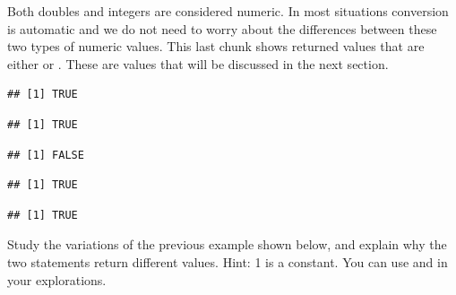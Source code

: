 \documentclass[krantz2]{krantz}\usepackage{knitr}%
\begin{document}
Both doubles and integers are considered numeric. In most situations conversion is automatic and we do not need to worry about the differences between these two types of numeric values. This last chunk shows returned values that are either  or . These are  values that will be discussed in the next section.

\begin{knitrout}\footnotesize
{}\color{fgcolor}\begin{kframe}
\begin{alltt}
\hlstd{(}\hlstd{)}
\end{alltt}
\begin{verbatim}
## [1] TRUE
\end{verbatim}
\begin{alltt}
\hlstd{(}\hlstd{)}
\end{alltt}
\begin{verbatim}
## [1] TRUE
\end{verbatim}
\begin{alltt}
\hlstd{(}\hlstd{)}
\end{alltt}
\begin{verbatim}
## [1] FALSE
\end{verbatim}
\begin{alltt}
\hlstd{(} \hlopt{/} \hlstd{)}
\end{alltt}
\begin{verbatim}
## [1] TRUE
\end{verbatim}
\begin{alltt}
\hlstd{(} \hlopt{/} \hlstd{)}
\end{alltt}
\begin{verbatim}
## [1] TRUE
\end{verbatim}
\end{kframe}
\end{knitrout}

\begin{advplayground}
Study the variations of the previous example shown below, and explain why the two statements return different values. Hint: 1 is a  constant. You can use  and  in your explorations.

\begin{knitrout}\footnotesize
{}\color{fgcolor}\begin{kframe}
\begin{alltt}
 \hlopt{*}  \hlopt{*} 
 \hlopt{*}  \hlopt{*} 
\end{alltt}
\end{kframe}
\end{knitrout}
\end{advplayground}
\end{document}
